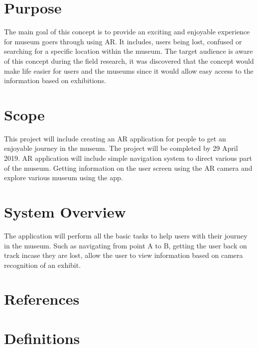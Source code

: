 
\section{Purpose}
The main goal of this concept is to provide an exciting and enjoyable experience for museum goers through using AR. It includes, users being lost, confused or searching for a specific location within the museum. The target audience is aware of this concept during the field research, it was discovered that the concept would make life easier for users and the museums since it would allow easy access to the information based on exhibitions.

\section{Scope}
This project will include creating an AR application for people to get an enjoyable journey in the museum. The project will be completed by 29 April 2019. AR application will include simple navigation system to direct various part of the museum. Getting information on the user screen using the AR camera and explore various museum using the app. 

\section{System Overview}
The application will perform all the basic tasks to help users with their journey in the museum. Such as navigating from point A to B, getting the user back on track incase they are lost, allow the user to view information based on camera recognition of an exhibit.

\section{References}

\section{Definitions}

